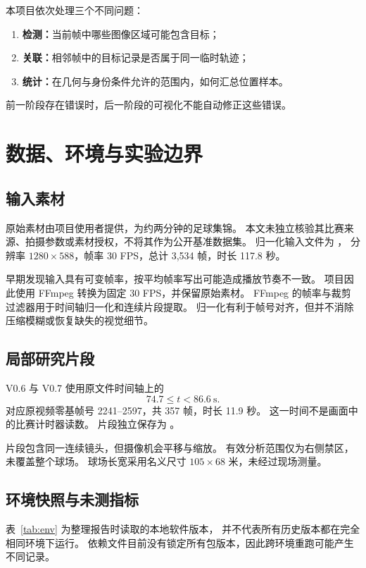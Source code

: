 \documentclass[UTF8,fontset=fandol,11pt,a4paper]{ctexart}
\begin{document}
本项目依次处理三个不同问题：
\begin{enumerate}
  \item \textbf{检测：}当前帧中哪些图像区域可能包含目标；
  \item \textbf{关联：}相邻帧中的目标记录是否属于同一临时轨迹；
  \item \textbf{统计：}在几何与身份条件允许的范围内，如何汇总位置样本。
\end{enumerate}
前一阶段存在错误时，后一阶段的可视化不能自动修正这些错误。

\section{数据、环境与实验边界}

\subsection{输入素材}
原始素材由项目使用者提供，为约两分钟的足球集锦。
本文未独立核验其比赛来源、拍摄参数或素材授权，不将其作为公开基准数据集。
归一化输入文件为 ，
分辨率 $1280\times588$，帧率 30 FPS，总计 3,534 帧，时长 117.8 秒。

早期发现输入具有可变帧率，按平均帧率写出可能造成播放节奏不一致。
项目因此使用 FFmpeg 转换为固定 30 FPS，并保留原始素材。
FFmpeg 的帧率与裁剪过滤器用于时间轴归一化和连续片段提取\cite{ffmpeg}。
归一化有利于帧号对齐，但并不消除压缩模糊或恢复缺失的视觉细节。

\subsection{局部研究片段}
V0.6 与 V0.7 使用原文件时间轴上的
\[
  74.7 \leq t < 86.6\ \mathrm{s}.
\]
对应原视频零基帧号 2241--2597，共 357 帧，时长 11.9 秒。
这一时间不是画面中的比赛计时器读数。
片段独立保存为 。

片段包含同一连续镜头，但摄像机会平移与缩放。
有效分析范围仅为右侧禁区，未覆盖整个球场。
球场长宽采用名义尺寸 $105\times68$ 米，未经过现场测量。

\subsection{环境快照与未测指标}
表~\ref{tab:env} 为整理报告时读取的本地软件版本，
并不代表所有历史版本都在完全相同环境下运行。
依赖文件目前没有锁定所有包版本，因此跨环境重跑可能产生不同记录。
\end{document}

